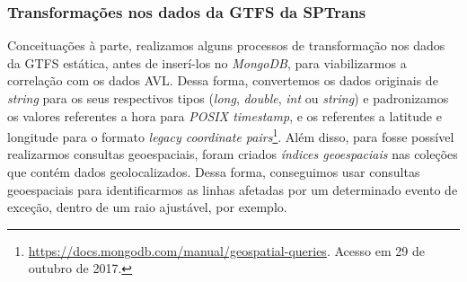 \documentclass[
	12pt,				%
	oneside,			%
	a4paper,			%
	english,			%
	brazil				%
	]{abntex2ppgsi}
\begin{document}
{{{%


\clearpage

\subsubsection{Transformações nos dados da GTFS da SPTrans}

Conceituações à parte, realizamos alguns processos de transformação nos dados da GTFS estática, antes de inserí-los no \textit{MongoDB}, para viabilizarmos a correlação com os dados AVL.  Dessa forma, convertemos os dados originais de \textit{string} para os seus respectivos tipos (\textit{long}, \textit{double}, \textit{int} ou \textit{string}) e padronizamos os valores referentes a hora para \textit{POSIX timestamp}, e os referentes a latitude e longitude para o formato \textit{legacy coordinate pairs}\footnote{\label{geoMongo}\url{https://docs.mongodb.com/manual/geospatial-queries}. Acesso em 29 de outubro de 2017.}. Além disso,  para fosse possível realizarmos consultas geoespaciais, foram criados \textit{índices geoespaciais} nas coleções que contém dados geolocalizados. Dessa forma, conseguimos usar consultas geoespaciais para identificarmos as linhas afetadas por um determinado evento de exceção, dentro de um raio ajustável, por exemplo.

}}}
\end{document}
